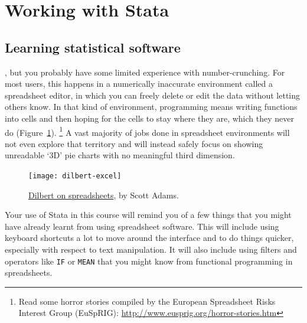 %
%
\section{Working with Stata}%
	\label{sec:stata}%
	
		
%
\subsection{Learning statistical software}%

%
%
, but you probably have some limited experience with number-crunching. For most users, this happens in a numerically inaccurate environment called a spreadsheet editor, in which you can freely delete or edit the data without letting others know. In that kind of environment, programming means writing functions into cells and then hoping for the cells to stay where they are, which they never do (Figure~\ref{fig:dilbert-spreadsheets}).%
	\footnote{Read some horror stories compiled by the European Spreadsheet %
	Risks Interest Group (EuSpRIG): %
	\url{http://www.eusprig.org/horror-stories.htm}} %
	A vast majority of jobs done in spreadsheet environments will not even explore that territory and will instead safely focus on showing unreadable `3D' pie charts with no meaningful third dimension.%

	\begin{figure}
		\texttt{[image: dilbert-excel]}
	  \caption{\href{http://dilbert.com/strips/comic/2007-08-08/}{Dilbert on spreadsheets}, by Scott Adams.}%
	  \label{fig:dilbert-spreadsheets}%
	\end{figure}

Your use of Stata in this course will remind you of a few things that you might have already learnt from using spreadsheet software. This will include using keyboard shortcuts a lot to move around the interface and to do things quicker, especially with respect to text manipulation. It will also include using filters and operators like \texttt{IF} or \texttt{MEAN} that you might know from functional programming in spreadsheets.%

